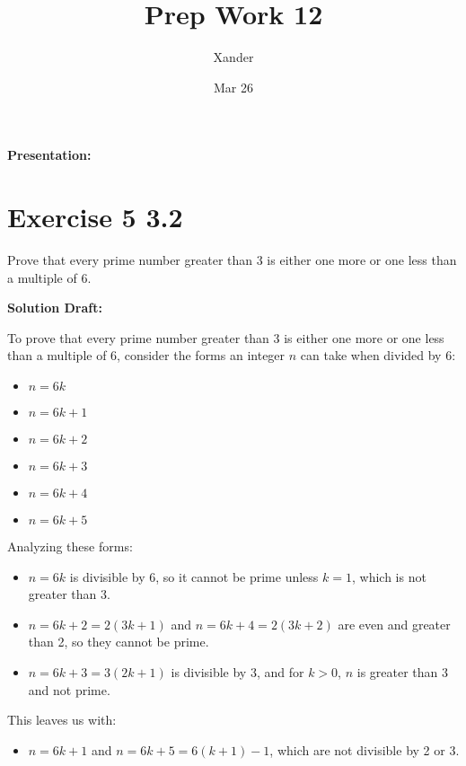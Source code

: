\documentclass{article}
\title{Prep Work 12}
\author{Xander}
\date{Mar 26}
\begin{document}
\maketitle
\noindent\textbf{Presentation: } 

\section*{Exercise 5 3.2}  

Prove that every prime number greater than 3 is either one more or one less than a multiple of 6.

\vspace{0.5cm}
\noindent\textbf{Solution Draft:} 
\vspace{0.2cm}

To prove that every prime number greater than 3 is either one more or one less than a multiple of 6, consider the forms an integer \(n\) can take when divided by 6:

\begin{itemize}
    \item \(n = 6k\)
    \item \(n = 6k + 1\)
    \item \(n = 6k + 2\)
    \item \(n = 6k + 3\)
    \item \(n = 6k + 4\)
    \item \(n = 6k + 5\)
\end{itemize}

Analyzing these forms:

\begin{itemize}
    \item \(n = 6k\) is divisible by 6, so it cannot be prime unless \(k=1\), which is not greater than 3.
    \item \(n = 6k + 2 = 2(3k+1)\) and \(n = 6k + 4 = 2(3k+2)\) are even and greater than 2, so they cannot be prime.
    \item \(n = 6k + 3 = 3(2k+1)\) is divisible by 3, and for \(k>0\), \(n\) is greater than 3 and not prime.
\end{itemize}

This leaves us with:

\begin{itemize}
    \item \(n = 6k + 1\) and \(n = 6k + 5 = 6(k+1) - 1\), which are not divisible by 2 or 3.
\end{itemize}
\end{document}
